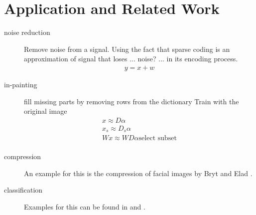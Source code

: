 \section{Application and Related Work}

\begin{description}
\item[noise reduction]
Remove noise from a signal. 
Using the fact that sparse coding is an approximation of signal that loses ... noise? ... in its encoding process. 
\begin{align*}
y = x + w
\end{align*}



\cite{Elad2006}

\item[in-painting]
fill missing parts by removing rows from the dictionary
Train with the original image
\begin{align*}
x \approx D\alpha\\
x_s \approx D_s\alpha\\
Wx \approx WD\alpha\text{select subset}\\
\end{align*}

\cite{mairal08sparse}

\item[compression] An example for this is the compression of facial images by Bryt and Elad \cite{Bryt2008}.
\item[classification] Examples for this can be found in \cite{Mairal2008b} and \cite{Bar2009}.


\end{description}





